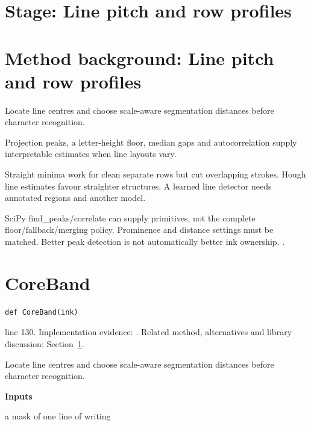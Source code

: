 \section*{Stage: Line pitch and row profiles}
\section{Method background: Line pitch and row profiles}\label{method:pitch}
Locate line centres and choose scale-aware segmentation distances before character recognition.


Projection peaks, a letter-height floor, median gaps and autocorrelation supply interpretable estimates when line layouts vary.


Straight minima work for clean separate rows but cut overlapping strokes. Hough line estimates favour straighter structures. A learned line detector needs annotated regions and another model.


SciPy find\_peaks/correlate can supply primitives, not the complete floor/fallback/merging policy. Prominence and distance settings must be matched. Better peak detection is not automatically better ink ownership. \cite{postl1986,scipypeaks}.


\section{CoreBand}\label{fn:segment:CoreBand}
\begin{lstlisting}[style=sig]
def CoreBand(ink)
\end{lstlisting}
 line 130. Implementation evidence: \cite{code2026}. Related method, alternatives and library discussion: Section~\ref{method:pitch}.


Locate line centres and choose scale-aware segmentation distances before character recognition.




\noindent\textbf{Inputs}
\begin{description}[leftmargin=2.2em,style=nextline,font=\normalfont\ttfamily]\setlength\itemsep{1pt}
  \item[{ink}] \normalfont a mask of one line of writing
\end{description}

